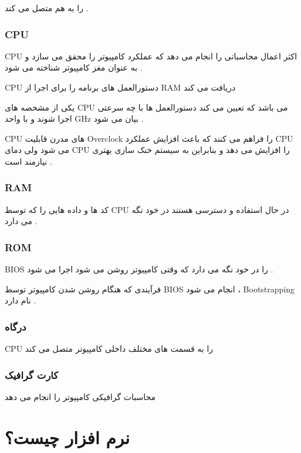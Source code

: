 \documentclass[12pt]{book}
\begin{document}
را به هم متصل می کند .

\subsubsection{CPU}

CPU
اکثر اعمال محاسباتی را انجام می دهد که عملکرد کامپیوتر را محقق می سازد و به عنوان مغز کامپیوتر شناخته می شود .

CPU
دستورالعمل های برنامه را برای اجرا از 
RAM
دریافت می کند 

یکی از مشخصه های 
CPU
می باشد که تعیین می کند دستورالعمل ها با چه سرعتی اجرا شوند و با واحد GHz بیان می شود .

CPU
های مدرن قابلیت Overclock را فراهم می کنند که باعث افزایش عملکرد CPU 
می شود ولی دمای
CPU
را افزایش می دهد و بنابراین به سیستم خنک سازی بهتری نیازمند است .

\subsubsection{RAM}

کد ها و داده هایی را که توسط CPU
در حال استفاده و دسترسی هستند در خود نگه می دارد .

\subsubsection{ROM}

BIOS
را در خود نگه می دارد که وقتی کامپیوتر روشن می شود اجرا می شود .

فرآیندی که هنگام روشن شدن کامپیوتر توسط 
BIOS
انجام می شود ، 
Bootstrapping
نام دارد .

\subsubsection{درگاه }

CPU
را به قسمت های مختلف داخلی کامپیوتر متصل می کند

\subsubsection{کارت گرافیک }

محاسبات گرافیکی کامپیوتر را انجام می دهد 


\section{نرم افزار چیست؟}
\end{document}
